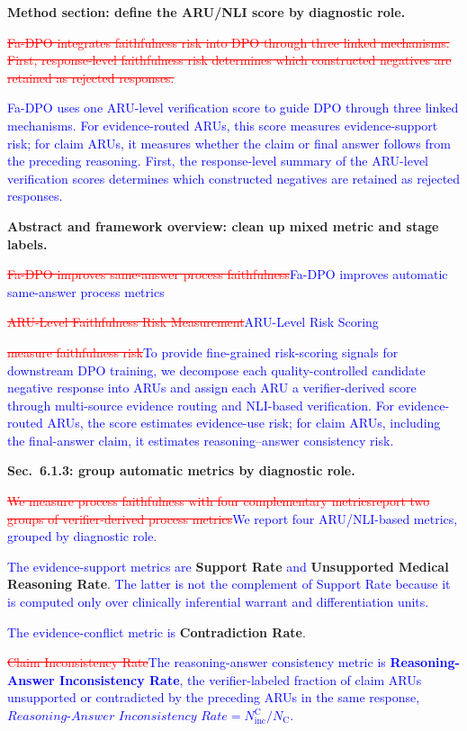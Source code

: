 \documentclass[12pt]{article}
\newcommand{\deleted}[1]{\textcolor{red}{\sout{#1}}}
\newcommand{\added}[1]{\textcolor{blue}{#1}}
\begin{document}
\textbf{Method section: define the ARU/NLI score by diagnostic role.}

\begin{displayquote}
\deleted{Fa-DPO integrates faithfulness risk into DPO through three linked mechanisms. First, response-level faithfulness risk determines which constructed negatives are retained as rejected responses.}

\added{Fa-DPO uses one ARU-level verification score to guide DPO through three linked mechanisms. For evidence-routed ARUs, this score measures evidence-support risk; for claim ARUs, it measures whether the claim or final answer follows from the preceding reasoning. First, the response-level summary of the ARU-level verification scores determines which constructed negatives are retained as rejected responses.}
\end{displayquote}

\textbf{Abstract and framework overview: clean up mixed metric and stage labels.}

\begin{displayquote}
\deleted{Fa-DPO improves same-answer process faithfulness}\added{Fa-DPO improves automatic same-answer process metrics}

\deleted{ARU-Level Faithfulness Risk Measurement}\added{ARU-Level Risk Scoring}

\deleted{measure faithfulness risk}\added{To provide fine-grained risk-scoring signals for downstream DPO training, we decompose each quality-controlled candidate negative response into ARUs and assign each ARU a verifier-derived score through multi-source evidence routing and NLI-based verification. For evidence-routed ARUs, the score estimates evidence-use risk; for claim ARUs, including the final-answer claim, it estimates reasoning--answer consistency risk.}
\end{displayquote}

\textbf{Sec.~6.1.3: group automatic metrics by diagnostic role.}

\begin{displayquote}
\deleted{We measure process faithfulness with four complementary metrics}\deleted{report two groups of verifier-derived process metrics}\added{We report four ARU/NLI-based metrics, grouped by diagnostic role.}

\added{The evidence-support metrics are} \textbf{Support Rate} \added{and} \textbf{Unsupported Medical Reasoning Rate}. \added{The latter is not the complement of Support Rate because it is computed only over clinically inferential warrant and differentiation units.}

\added{The evidence-conflict metric is} \textbf{Contradiction Rate}.

\deleted{Claim Inconsistency Rate}\added{The reasoning-answer consistency metric is \textbf{Reasoning-Answer Inconsistency Rate}, the verifier-labeled fraction of claim ARUs unsupported or contradicted by the preceding ARUs in the same response, $\textit{Reasoning-Answer Inconsistency Rate} = N_{\text{inc}}^{\text{C}} / N_{\text{C}}$.}
\end{displayquote}
\end{document}
